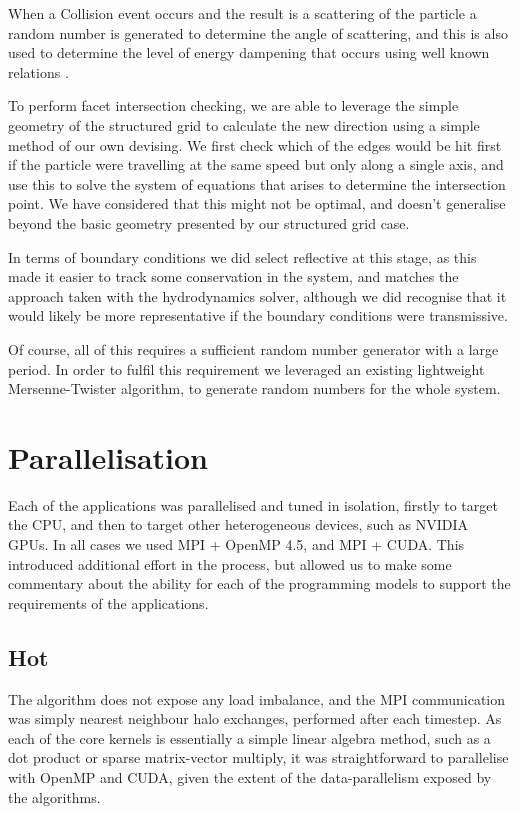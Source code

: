 \documentclass[runningheads,a4paper]{llncs}
\begin{document}
When a Collision event occurs and the result is a scattering of the particle a random number is generated to determine the angle of scattering, and this is also used to determine the level of energy dampening that occurs using well known relations \cite{}.

To perform facet intersection checking, we are able to leverage the simple geometry of the structured grid to calculate the new direction using a simple method of our own devising. We first check which of the edges would be hit first if the particle were travelling at the same speed but only along a single axis, and use this to solve the system of equations that arises to determine the intersection point. We have considered that this might not be optimal, and doesn't generalise beyond the basic geometry presented by our structured grid case.

In terms of boundary conditions we did select reflective at this stage, as this made it easier to track some conservation in the system, and matches the approach taken with the hydrodynamics solver, although we did recognise that it would likely be more representative if the boundary conditions were transmissive.

Of course, all of this requires a sufficient random number generator with a large period. In order to fulfil this requirement we leveraged an existing lightweight Mersenne-Twister algorithm, to generate random numbers for the whole system.

\section{Parallelisation}

Each of the applications was parallelised and tuned in isolation, firstly to target the CPU, and then to target other heterogeneous devices, such as NVIDIA GPUs. In all cases we used MPI + OpenMP 4.5, and MPI + CUDA. This introduced additional effort in the process, but allowed us to make some commentary about the ability for each of the programming models to support the requirements of the applications.

\subsection{Hot}

The algorithm does not expose any load imbalance, and the MPI communication was simply nearest neighbour halo exchanges, performed after each timestep. As each of the core kernels is essentially a simple linear algebra method, such as a dot product or sparse matrix-vector multiply, it was straightforward to parallelise with OpenMP and CUDA, given the extent of the data-parallelism exposed by the algorithms.
\end{document}
